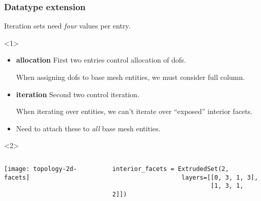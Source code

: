 \documentclass[presentation]{beamer}
\begin{document}
\begin{frame}[fragile]
  \frametitle{Datatype extension}
  Iteration sets need \emph{four} values per entry.

  \begin{overlayarea}{\textwidth}{0.7\textheight}
    \begin{onlyenv}<1>
      \begin{itemize}
      \item \textbf{allocation} First two entries control allocation of dofs.

        When assigning dofs to base mesh entities, we must consider
        full column.
      \item \textbf{iteration} Second two control iteration.

        When iterating over entities, we can't iterate over ``exposed''
        interior facets.

      \item Need to attach these to \emph{all} base mesh entities.
      \end{itemize}
    \end{onlyenv}
    \begin{onlyenv}<2>
      \begin{columns}
        \begin{column}{0.6\textwidth}
          \begin{center}
            \texttt{[image: topology-2d-facets]}
          \end{center}
        \end{column}
        \begin{column}{0.5\textwidth}
\begin{verbatim}
interior_facets = ExtrudedSet(2,
                   layers=[[0, 3, 1, 3],
                           [1, 3, 1, 2]])
\end{verbatim}
        \end{column}
      \end{columns}
    \end{onlyenv}
  \end{overlayarea}
\end{frame}
\end{document}
